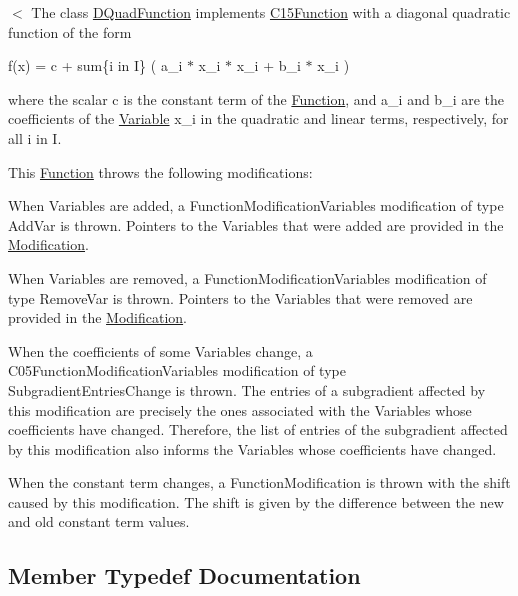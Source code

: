 $<$ The class \mbox{\hyperlink{class_s_m_spp__di__unipi__it_1_1_d_quad_function}{D\+Quad\+Function}} implements \mbox{\hyperlink{class_s_m_spp__di__unipi__it_1_1_c15_function}{C15\+Function}} with a diagonal quadratic function of the form

f(x) = c + sum\{i in I\} ( a\+\_\+i $\ast$ x\+\_\+i $\ast$ x\+\_\+i + b\+\_\+i $\ast$ x\+\_\+i )

where the scalar c is the constant term of the \mbox{\hyperlink{class_s_m_spp__di__unipi__it_1_1_function}{Function}}, and a\+\_\+i and b\+\_\+i are the coefficients of the \mbox{\hyperlink{class_s_m_spp__di__unipi__it_1_1_variable}{Variable}} x\+\_\+i in the quadratic and linear terms, respectively, for all i in I.

This \mbox{\hyperlink{class_s_m_spp__di__unipi__it_1_1_function}{Function}} throws the following modifications\+:


\begin{DoxyItemize}
\item When Variables are added, a Function\+Modification\+Variables modification of type Add\+Var is thrown. Pointers to the Variables that were added are provided in the \mbox{\hyperlink{class_s_m_spp__di__unipi__it_1_1_modification}{Modification}}.
\item When Variables are removed, a Function\+Modification\+Variables modification of type Remove\+Var is thrown. Pointers to the Variables that were removed are provided in the \mbox{\hyperlink{class_s_m_spp__di__unipi__it_1_1_modification}{Modification}}.
\item When the coefficients of some Variables change, a C05\+Function\+Modification\+Variables modification of type Subgradient\+Entries\+Change is thrown. The entries of a subgradient affected by this modification are precisely the ones associated with the Variables whose coefficients have changed. Therefore, the list of entries of the subgradient affected by this modification also informs the Variables whose coefficients have changed.
\item When the constant term changes, a Function\+Modification is thrown with the shift caused by this modification. The shift is given by the difference between the new and old constant term values. 
\end{DoxyItemize}

\subsection{Member Typedef Documentation}
\mbox{\label{class_s_m_spp__di__unipi__it_1_1_d_quad_function_a4da2c2c235cb90ba0e970725de950bf9}} 

